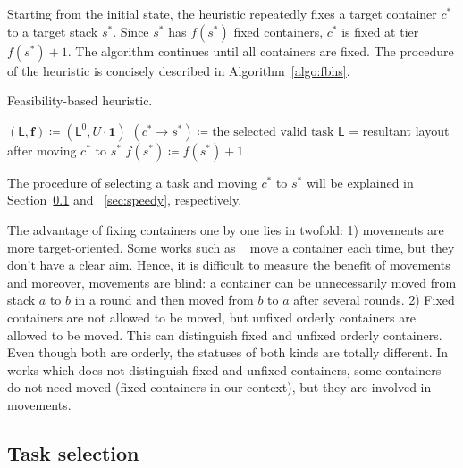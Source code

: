 \documentclass[review,3p,times,12pt,number]{elsarticle}\usepackage{amsmath}\usepackage{amssymb}
\renewcommand{\gets}{\coloneqq}
\newcommand{\setalgo}{\linespread{1}\fontsize{10}{12}\selectfont}
\begin{document}
Starting from the initial state, the heuristic repeatedly fixes a target container $c^*$ to a target stack $s^*$.
Since $s^*$ has $f(s^*)$ fixed containers, $c^*$ is fixed at tier $f(s^*)+1$. The algorithm continues until all containers are fixed. The procedure of the heuristic is concisely described in Algorithm~\ref{algo:fbhs}.

\begin{algorithm}[htbp]
\caption{Feasibility-based heuristic.}
\label{algo:fbhs}


\setalgo


\Begin
{
  $(\mathsf{L},\boldsymbol{f})\gets (\mathsf{L}^0,U\cdot\boldsymbol{1})$\;
  {
    $(c^*\rightarrow s^*)\gets\textrm{the selected valid task}$\;
    $\mathsf{L}$ = resultant layout after moving $c^*$ to $s^*$\;
    $f(s^*)\gets f(s^*)+1$\;
  }
}

\end{algorithm}

The procedure of selecting a task and moving $c^*$ to $s^*$ will be explained in Section~\ref{sec:task_sel} and ~\ref{sec:speedy}, respectively.

The advantage of fixing containers one by one lies in twofold: 1) movements are more target-oriented. Some works such as ~\cite{bort2012} move a container each time, but they don't have a clear aim. Hence, it is difficult to measure the benefit of movements and moreover, movements are blind: a container can be unnecessarily moved from stack $a$ to $b$ in a round and then moved from $b$ to $a$ after several rounds.
2) Fixed containers are not allowed to be moved, but unfixed orderly containers are allowed to be moved. This can distinguish fixed and unfixed orderly containers. Even though both are orderly, the statuses of both kinds are totally different. In works which does not distinguish fixed and unfixed containers, some containers do not need moved (fixed containers in our context), but they are involved in movements.


\subsection{Task selection}
\label{sec:task_sel}
\end{document}
